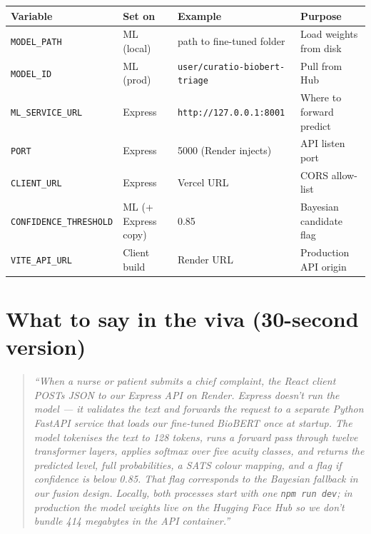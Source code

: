 \documentclass[11pt]{article}
\begin{document}
\begin{center}
\small
\begin{tabular}{@{}llll@{}}
\toprule
\textbf{Variable} & \textbf{Set on} & \textbf{Example} & \textbf{Purpose} \\
\midrule
\texttt{MODEL\_PATH} & ML (local) & path to fine-tuned folder & Load weights from disk \\
\texttt{MODEL\_ID} & ML (prod) & \texttt{user/curatio-biobert-triage} & Pull from Hub \\
\texttt{ML\_SERVICE\_URL} & Express & \texttt{http://127.0.0.1:8001} & Where to forward predict \\
\texttt{PORT} & Express & 5000 (Render injects) & API listen port \\
\texttt{CLIENT\_URL} & Express & Vercel URL & CORS allow-list \\
\texttt{CONFIDENCE\_THRESHOLD} & ML (+ Express copy) & 0.85 & Bayesian candidate flag \\
\texttt{VITE\_API\_URL} & Client build & Render URL & Production API origin \\
\bottomrule
\end{tabular}
\end{center}

\section{What to say in the viva (30-second version)}

\begin{quote}
\emph{``When a nurse or patient submits a chief complaint, the React client POSTs JSON to our
Express API on Render. Express doesn't run the model --- it validates the text and forwards the
request to a separate Python FastAPI service that loads our fine-tuned BioBERT once at startup.
The model tokenises the text to 128 tokens, runs a forward pass through twelve transformer layers,
applies softmax over five acuity classes, and returns the predicted level, full probabilities, a
SATS colour mapping, and a flag if confidence is below 0.85. That flag corresponds to the Bayesian
fallback in our fusion design. Locally, both processes start with one \texttt{npm run dev}; in
production the model weights live on the Hugging Face Hub so we don't bundle 414 megabytes in the
API container.''}
\end{quote}

\end{document}
